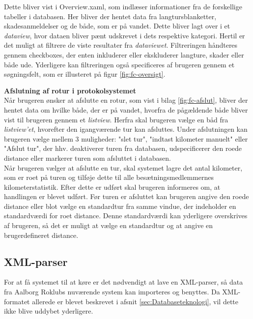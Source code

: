 Dette bliver vist i Overview.xaml, som indlæser informationer fra de forskellige tabeller i databasen. Her bliver der hentet data fra langtursblanketter, skadesanmeldelser og de både, som er på vandet. Dette bliver lagt over i et \textit{dataview}, hvor dataen bliver pænt udskrevet i dets respektive kategori. Hertil er det muligt at filtrere de viste resultater fra \textit{dataviewet}. Filtreringen håndteres gennem checkboxes, der enten inkluderer eller ekskluderer langture, skader eller både ude. Yderligere kan filtreringen også specificeres af brugeren gennem et søgningsfelt, som er illusteret på figur \ref{fig:fc-oversigt}.


{\textbf{Afslutning af rotur i protokolsystemet}}\\
Når brugeren ønsker at afslutte en rotur, som vist i bilag \ref{fig:fc-afslut}, bliver der hentet data om hvilke både, der er på vandet, hvorfra de pågældende både bliver vist til brugeren gennem et \textit{listview}. Herfra skal brugeren vælge en båd fra \textit{listview'et}, hvorefter den igangværende tur kan afsluttes. Under afslutningen kan brugeren vælge mellem 3 muligheder: "slet tur", "indtast kilometer manuelt" eller "Afslut tur", der hhv. deaktiverer turen fra databasen, udspecificerer den roede distance eller markerer turen som afsluttet i databasen.\\

Når brugeren vælger at afslutte en tur, skal systemet lagre det antal kilometer, som er roet på turen og tilføje dette til alle besætningsmedlemmernes kilometerstatistik. Efter dette er udført skal brugeren informeres om, at handlingen er blevet udført. Før turen er afsluttet kan brugeren angive den roede distance eller blot vælge en standardtur fra samme vindue, der indeholder en standardværdi for roet distance. Denne standardværdi kan yderligere overskrives af brugeren, så det er muligt at vælge en standardtur og at angive en brugerdefineret distance.\\


\subsection{XML-parser}
\label{sec:xmlparser}
For at få systemet til at køre er det nødvendigt at lave en XML-parser, så data fra Aalborg Roklubs nuværende system kan importeres og benyttes. Da XML-formatet allerede er blevet beskrevet i afsnit \ref{sec:Databaseteknologi}, vil dette ikke blive uddybet yderligere.\\

